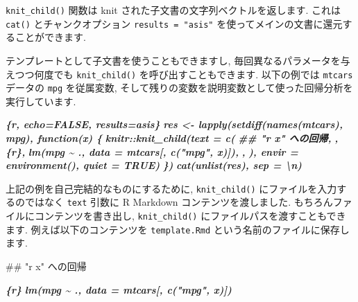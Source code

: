 \documentclass[
  11pt,
  lualatex,ja=standard,jafont=noto]{bxjsreport}
\newenvironment{Shaded}{\begin{snugshade}}{\end{snugshade}}
\newcommand{\FunctionTok}[1]{\textcolor[rgb]{0.00,0.00,0.00}{#1}}
\newcommand{\InformationTok}[1]{\textcolor[rgb]{0.56,0.35,0.01}{\textbf{\textit{#1}}}}
\begin{document}
\texttt{knit\_child()} 関数は knit された子文書の文字列ベクトルを返します. これは \texttt{cat()} とチャンクオプション \texttt{results = "asis"} を使ってメインの文書に還元することができます.

テンプレートとして子文書を使うこともできますし, 毎回異なるパラメータを与えつつ何度でも \texttt{knit\_child()} を呼び出すこともできます. 以下の例では \texttt{mtcars} データの \texttt{mpg} を従属変数, そして残りの変数を説明変数として使った回帰分析を実行しています.

\begin{Shaded}
\begin{Highlighting}[]
\InformationTok{\textasciigrave{}\textasciigrave{}\textasciigrave{}\{r, echo=FALSE, results=\textquotesingle{}asis\textquotesingle{}\}}
\InformationTok{res \textless{}{-} lapply(setdiff(names(mtcars), \textquotesingle{}mpg\textquotesingle{}), function(x) \{}
\InformationTok{  knitr::knit\_child(text = c(}
\InformationTok{    \textquotesingle{}\#\# "\textasciigrave{}r x\textasciigrave{}" への回帰\textquotesingle{},}
\InformationTok{    \textquotesingle{}\textquotesingle{},}
\InformationTok{    \textquotesingle{}\textasciigrave{}\textasciigrave{}\textasciigrave{}\{r\}\textquotesingle{},}
\InformationTok{    \textquotesingle{}lm(mpg \textasciitilde{} ., data = mtcars[, c("mpg", x)])\textquotesingle{},}
\InformationTok{    \textquotesingle{}\textasciigrave{}\textasciigrave{}\textasciigrave{}\textquotesingle{},}
\InformationTok{    \textquotesingle{}\textquotesingle{}}
\InformationTok{  ), envir = environment(), quiet = TRUE)}
\InformationTok{\})}
\InformationTok{cat(unlist(res), sep = \textquotesingle{}\textbackslash{}n\textquotesingle{})}
\InformationTok{\textasciigrave{}\textasciigrave{}\textasciigrave{}}
\end{Highlighting}
\end{Shaded}

上記の例を自己完結的なものにするために, \texttt{knit\_child()} にファイルを入力するのではなく \texttt{text} 引数に R Markdown コンテンツを渡しました. もちろんファイルにコンテンツを書き出し, \texttt{knit\_child()} にファイルパスを渡すこともできます. 例えば以下のコンテンツを \texttt{template.Rmd} という名前のファイルに保存します.

\begin{Shaded}
\begin{Highlighting}[]
\FunctionTok{\#\# "\textasciigrave{}r x\textasciigrave{}" への回帰}

\InformationTok{\textasciigrave{}\textasciigrave{}\textasciigrave{}\{r\}}
\InformationTok{lm(mpg \textasciitilde{} ., data = mtcars[, c("mpg", x)])}
\InformationTok{\textasciigrave{}\textasciigrave{}\textasciigrave{}}
\end{Highlighting}
\end{Shaded}
\end{document}
